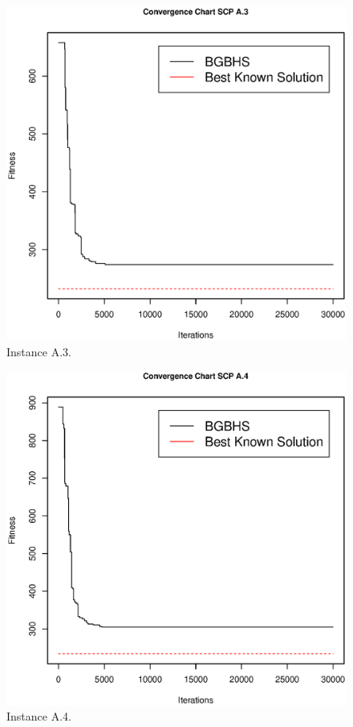 \begin{figure}[]
\centering
\includegraphics[scale=.45]{Resultados/scpA3.eps}
\caption{Instance A.3.}
\label{fig:Instance.A.3}
\end{figure}

\begin{figure}[]
\centering
\includegraphics[scale=.45]{Resultados/scpA4.eps}
\caption{Instance A.4.}
\label{fig:Instance.A.4}
\end{figure}

